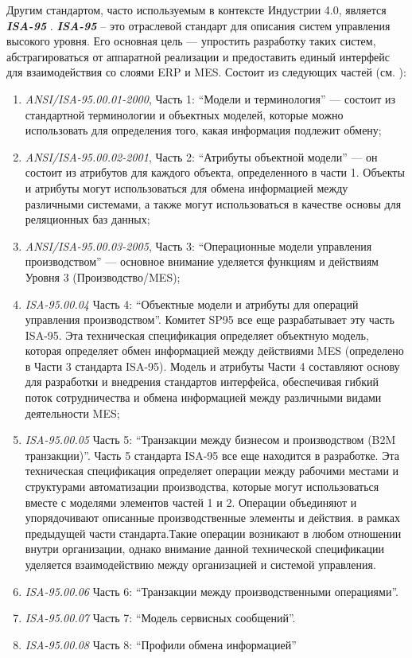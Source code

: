Другим стандартом, часто используемым в контексте Индустрии 4.0, является \textit{\textbf{ISA-95}} \cite{ISA95}. \textit{\textbf{ISA-95}} -- это отраслевой стандарт для описания систем управления высокого уровня. Его основная цель — упростить разработку таких систем, абстрагироваться от аппаратной реализации и предоставить единый интерфейс для взаимодействия со слоями ERP и MES. Состоит из следующих частей (см. ):
\begin{enumerate}
    \item \textit {ANSI/ISA-95.00.01-2000}, Часть 1: ``Модели и терминология'' — состоит из стандартной терминологии и объектных моделей, которые можно использовать для определения того, какая информация подлежит обмену;
    \item \textit {ANSI/ISA-95.00.02-2001}, Часть 2: ``Атрибуты объектной модели'' — он состоит из атрибутов для каждого объекта, определенного в части 1. Объекты и атрибуты могут использоваться для обмена информацией между различными системами, а также могут использоваться в качестве основы для реляционных баз данных;
    \item \textit {ANSI/ISA-95.00.03-2005}, Часть 3: ``Операционные модели управления производством'' — основное внимание уделяется функциям и действиям Уровня 3 (Производство/MES);
    \item \textit {ISA-95.00.04} Часть 4: ``Объектные модели и атрибуты для операций управления производством''. Комитет SP95 все еще разрабатывает эту часть ISA-95. Эта техническая спецификация определяет объектную модель, которая определяет обмен информацией между действиями MES (определено в Части 3 стандарта ISA-95). Модель и атрибуты Части 4 составляют основу для разработки и внедрения стандартов интерфейса, обеспечивая гибкий поток сотрудничества и обмена информацией между различными видами деятельности MES;
    \item \textit {ISA-95.00.05} Часть 5: ``Транзакции между бизнесом и производством (B2M транзакции)''. Часть 5 стандарта ISA-95 все еще находится в разработке. Эта техническая спецификация определяет операции между рабочими местами и структурами автоматизации производства, которые могут использоваться вместе с моделями элементов частей 1 и 2. Операции объединяют и упорядочивают описанные производственные элементы и действия. в рамках предыдущей части стандарта.Такие операции возникают в любом отношении внутри организации, однако внимание данной технической спецификации уделяется взаимодействию между организацией и системой управления.
    \item \textit {ISA-95.00.06} Часть 6: ``Транзакции между производственными операциями''.
    \item \textit {ISA-95.00.07} Часть 7: ``Модель сервисных сообщений''.
    \item \textit {ISA-95.00.08} Часть 8: ``Профили обмена информацией''
\end{enumerate}

